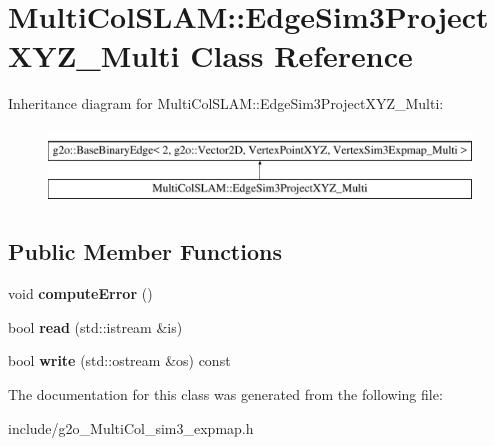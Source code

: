 \hypertarget{classMultiColSLAM_1_1EdgeSim3ProjectXYZ__Multi}{}\section{Multi\+Col\+S\+L\+AM\+:\+:Edge\+Sim3\+Project\+X\+Y\+Z\+\_\+\+Multi Class Reference}
\label{classMultiColSLAM_1_1EdgeSim3ProjectXYZ__Multi}
Inheritance diagram for Multi\+Col\+S\+L\+AM\+:\+:Edge\+Sim3\+Project\+X\+Y\+Z\+\_\+\+Multi\+:\begin{figure}[H]
\begin{center}
\leavevmode
\includegraphics[height=2.000000cm]{classMultiColSLAM_1_1EdgeSim3ProjectXYZ__Multi}
\end{center}
\end{figure}
\subsection*{Public Member Functions}
\begin{DoxyCompactItemize}
\item 
void {\bfseries compute\+Error} ()\hypertarget{classMultiColSLAM_1_1EdgeSim3ProjectXYZ__Multi_a3fd027e5a2eef9364d1f5e75ab3fe1f2}{}\label{classMultiColSLAM_1_1EdgeSim3ProjectXYZ__Multi_a3fd027e5a2eef9364d1f5e75ab3fe1f2}

\item 
bool {\bfseries read} (std\+::istream \&is)\hypertarget{classMultiColSLAM_1_1EdgeSim3ProjectXYZ__Multi_aae98a41d1bebf78e191b1603ce896926}{}\label{classMultiColSLAM_1_1EdgeSim3ProjectXYZ__Multi_aae98a41d1bebf78e191b1603ce896926}

\item 
bool {\bfseries write} (std\+::ostream \&os) const \hypertarget{classMultiColSLAM_1_1EdgeSim3ProjectXYZ__Multi_ac91372b0ac8383263aa6a86f684e61ca}{}\label{classMultiColSLAM_1_1EdgeSim3ProjectXYZ__Multi_ac91372b0ac8383263aa6a86f684e61ca}

\end{DoxyCompactItemize}


The documentation for this class was generated from the following file\+:\begin{DoxyCompactItemize}
\item 
include/g2o\+\_\+\+Multi\+Col\+\_\+sim3\+\_\+expmap.\+h\end{DoxyCompactItemize}
